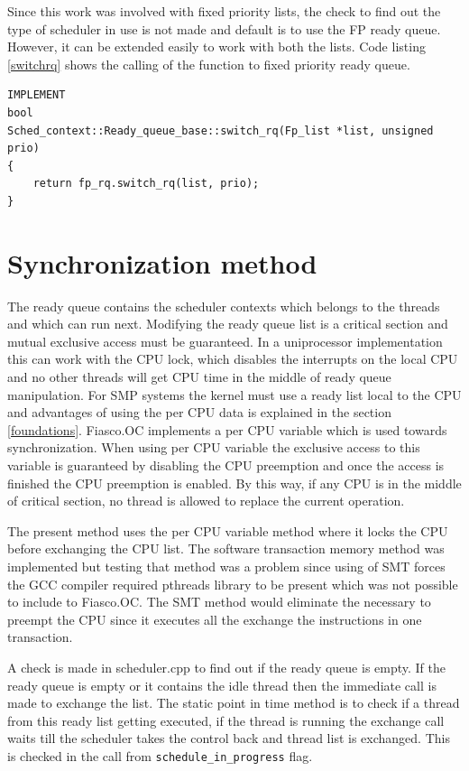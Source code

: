 Since this work was involved with fixed priority lists, the check to find out the type of scheduler in use is not made and default is to use the FP ready queue. However, it can be extended easily to work with both the lists. Code listing \ref{switchrq} shows the calling of the function to fixed priority ready queue.

\begin{lstlisting}[caption={Exchanging the ready queue},label=switchrq, style=customcpp]
IMPLEMENT
bool
Sched_context::Ready_queue_base::switch_rq(Fp_list *list, unsigned prio)
{
	return fp_rq.switch_rq(list, prio);
}
\end{lstlisting}

\section{Synchronization method}\label{imp:sync}

The ready queue contains the scheduler contexts which belongs to the threads and which can run next. Modifying the ready queue list is a critical section and mutual exclusive access must be guaranteed. In a uniprocessor implementation this can work with the CPU lock, which disables the interrupts on the local CPU and no other threads will get CPU time in the middle of ready queue manipulation. For SMP systems the kernel must use a ready list local to the CPU and advantages of using the per CPU data is explained in the section \ref{foundations}. Fiasco.OC implements a per CPU variable which is used towards synchronization. When using per CPU variable the exclusive access to this variable is guaranteed by disabling the CPU preemption and once the access is finished the CPU preemption is enabled. By this way, if any CPU is in the middle of critical section, no thread is allowed to replace the current operation. 

The present method uses the per CPU variable method where it locks the CPU before exchanging the CPU list. The software transaction memory method was implemented but testing that method was a problem since using of SMT forces the GCC compiler required pthreads library to be present which was not possible to include to Fiasco.OC. The SMT method would eliminate the necessary to preempt the CPU since it executes all the exchange the instructions in one transaction.

A check is made in scheduler.cpp to find out if the ready queue is empty. If the ready queue is empty or it contains the idle thread then the immediate call is made to exchange the list. The static point in time method is to check if a thread from this ready list getting executed, if the thread is running
the exchange call waits till the scheduler takes the control back and thread list is exchanged. This is checked in the call from \texttt{schedule\_in\_progress} flag. 


